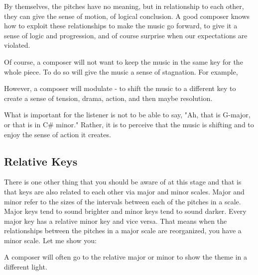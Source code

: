 By themselves, the pitches have no meaning, but in relationship to each other, they can give the sense of motion, of logical conclusion. A good composer knows how to exploit these relationships to make the music go forward, to give it a sense of logic and progression, and of course surprise when our expectations are violated.

Of course, a composer will not want to keep the music in the same key for the whole piece. To do so will give the music a sense of stagnation. For example, 

However, a composer will modulate - to shift the music to a different key to create a sense of tension, drama, action, and then maybe resolution.

What is important for the listener is not to be able to say, "Ah, that is G-major, or that is in C# minor." Rather, it is to perceive that the music is shifting and to enjoy the sense of action it creates.

\subsection{Relative Keys}
There is one other thing that you should be aware of at this stage and that is that keys are also related to each other via major and minor scales. Major and minor refer to the sizes of the intervals between each of the pitches in a scale. Major keys tend to sound brighter and minor keys tend to sound darker. Every major key has a relative minor key and vice versa. That means when the relationships between the pitches in a major scale are reorganized, you have a minor scale. Let me show you:


A composer will often go to the relative major or minor to show the theme in a different light.
